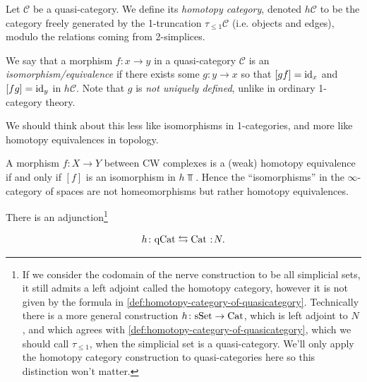 \documentclass[11pt]{amsart}
\begin{document}
\begin{definition}\label{def:homotopy-category-of-quasicategory} 
Let $\mathscr{C}$ be a quasi-category. We define its \textit{homotopy category}, denoted $h\mathscr{C}$ to be the category freely generated by the 1-truncation $\tau_{\le 1} \mathscr{C}$ (i.e. objects and edges), modulo the relations coming from 2-simplices.
\end{definition}

\begin{definition} We say that a morphism $f \colon x \to y$ in a quasi-category $\mathscr{C}$ is an \textit{isomorphism/equivalence} if there exists some $g \colon y \to x$ so that $[gf]=\mathrm{id}_x$ and $[fg]=\mathrm{id}_y$ in $h\mathscr{C}$. Note that $g$ is \textit{not uniquely defined}, unlike in ordinary 1-category theory.
\end{definition}

\begin{remark} We should think about this less like isomorphisms in 1-categories, and more like homotopy equivalences in topology.
\end{remark}

\begin{example} A morphism $f\colon X\to Y$ between CW complexes is a (weak) homotopy equivalence if and only if $[f]$ is an isomorphism in $h\Top$. Hence the ``isomorphisms'' in the $\infty$-category of spaces are not homeomorphisms but rather homotopy equivalences.
\end{example}


\begin{proposition}\label{prop:nerve-adjunction}
There is an adjunction\footnote{%
If we consider the codomain of the nerve construction to be all simplicial sets, it still admits a left adjoint called the homotopy category, however it is not given by the formula in \autoref{def:homotopy-category-of-quasicategory}. Technically there is a more general construction $h \colon \mathrm{sSet}\to \mathrm{Cat}$, which is left adjoint to $N$, and which agrees with \autoref{def:homotopy-category-of-quasicategory}, which we should call $\tau_{\le 1}$, when the simplicial set is a quasi-category. We'll only apply the homotopy category construction to quasi-categories here so this distinction won't matter.
}


\begin{align*}
    h\colon \qCat \leftrightarrows \Cat \noloc N.
\end{align*}
\end{proposition}
\end{document}
